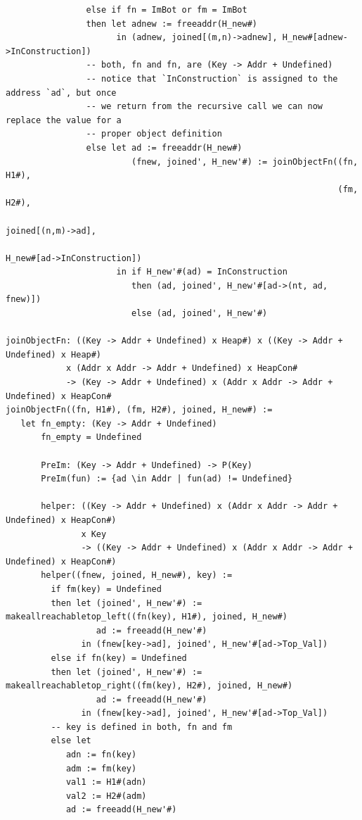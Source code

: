\documentclass[
11pt, %
english, %
singlespacing, %
headsepline, %
]{MastersDoctoralThesis} %
\begin{document}
\begin{verbatim}
                else if fn = ImBot or fm = ImBot
                then let adnew := freeaddr(H_new#)
                      in (adnew, joined[(m,n)->adnew], H_new#[adnew->InConstruction])
                -- both, fn and fn, are (Key -> Addr + Undefined)
                -- notice that `InConstruction` is assigned to the address `ad`, but once
                -- we return from the recursive call we can now replace the value for a
                -- proper object definition
                else let ad := freeaddr(H_new#)
                         (fnew, joined', H_new'#) := joinObjectFn((fn, H1#),
                                                                  (fm, H2#),
                                                                  joined[(n,m)->ad],
                                                                  H_new#[ad->InConstruction])
                      in if H_new'#(ad) = InConstruction
                         then (ad, joined', H_new'#[ad->(nt, ad, fnew)])
                         else (ad, joined', H_new'#)

joinObjectFn: ((Key -> Addr + Undefined) x Heap#) x ((Key -> Addr + Undefined) x Heap#)
            x (Addr x Addr -> Addr + Undefined) x HeapCon#
            -> (Key -> Addr + Undefined) x (Addr x Addr -> Addr + Undefined) x HeapCon#
joinObjectFn((fn, H1#), (fm, H2#), joined, H_new#) :=
   let fn_empty: (Key -> Addr + Undefined)
       fn_empty = Undefined

       PreIm: (Key -> Addr + Undefined) -> P(Key)
       PreIm(fun) := {ad \in Addr | fun(ad) != Undefined}

       helper: ((Key -> Addr + Undefined) x (Addr x Addr -> Addr + Undefined) x HeapCon#)
               x Key
               -> ((Key -> Addr + Undefined) x (Addr x Addr -> Addr + Undefined) x HeapCon#)
       helper((fnew, joined, H_new#), key) :=
         if fm(key) = Undefined
         then let (joined', H_new'#) := makeallreachabletop_left((fn(key), H1#), joined, H_new#)
                  ad := freeadd(H_new'#)
               in (fnew[key->ad], joined', H_new'#[ad->Top_Val])
         else if fn(key) = Undefined
         then let (joined', H_new'#) := makeallreachabletop_right((fm(key), H2#), joined, H_new#)
                  ad := freeadd(H_new'#)
               in (fnew[key->ad], joined', H_new'#[ad->Top_Val])
         -- key is defined in both, fn and fm
         else let
            adn := fn(key)
            adm := fm(key)
            val1 := H1#(adn)
            val2 := H2#(adm)
            ad := freeadd(H_new'#)


\end{verbatim}
\end{document}
